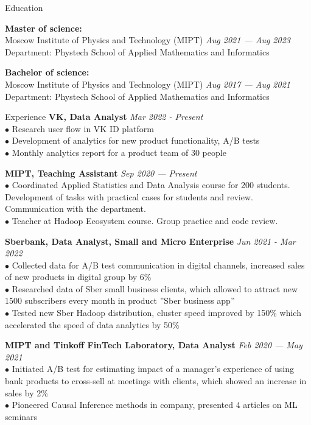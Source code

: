 \documentclass{resume} %
\begin{document}
\begin{rSection}{ Education }

{\bf Master of science:} \\
{Moscow Institute of Physics and Technology (MIPT)} \hfill {\em Aug 2021 — Aug 2023} \\ 
{Department:} {Phystech School of Applied Mathematics and Informatics}

{\bf Bachelor of science:} \\
{Moscow Institute of Physics and Technology (MIPT)} \hfill {\em Aug 2017 — Aug 2021} \\ 
{Department:} {Phystech School of Applied Mathematics and Informatics}

\end{rSection}

\begin{rSection}{ Experience }
    { \bf VK, Data Analyst} \hfill {\em Mar 2022 - Present}\\
    { $\bullet$ Research user flow in VK ID platform } \\
    { $\bullet$ Development of analytics for new product functionality, A/B tests} \\
    { $\bullet$ Monthly analytics report for a product team of 30 people }
    
    { \bf MIPT, Teaching Assistant} \hfill {\em Sep 2020 — Present}\\
    { $\bullet$ Coordinated Applied Statistics and Data Analysis course for 200 students. Development of tasks with practical cases for students and review. Communication with the department. } \\
    { $\bullet$ Teacher at Hadoop Ecosystem course. Group practice and code review. }

    { \bf Sberbank, Data Analyst, Small and Micro Enterprise} \hfill {\em Jun 2021 - Mar 2022}\\
    { $\bullet$ Collected data for A/B test communication in digital channels, increased sales of new products in digital group by 6\% }\\
    { $\bullet$ Researched data of Sber small business clients, which allowed to attract new 1500 subscribers every month in product ''Sber business app'' }\\
    { $\bullet$ Tested new Sber Hadoop distribution, cluster speed improved by 150\% which accelerated the speed of data analytics by 50\%}
    
    { \bf MIPT and Tinkoff FinTech Laboratory, Data Analyst } \hfill {\em Feb 2020 — May 2021}\\
    { $\bullet$ Initiated A/B test for estimating impact of a manager's experience of using bank products to cross-sell at meetings with clients, which showed an increase in sales by 2\% }\\
    { $\bullet$ Pioneered Causal Inference methods in company, presented 4 articles on ML seminars  }
        

\end{rSection}
\end{document}

